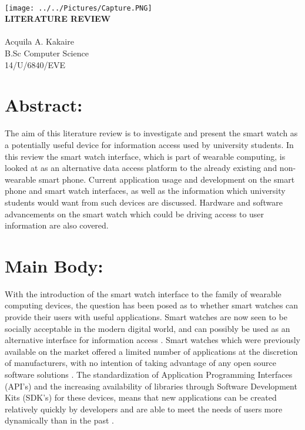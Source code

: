 \documentclass[10pt,a4paper]{article}
\begin{document}
\textbf{}\\


\begin{center}
\texttt{[image: ../../Pictures/Capture.PNG]}\\\vspace{3cm}
  {\Huge \textbf{LITERATURE REVIEW}}
  \\\vspace{1.00cm}{\Large An investigation into the usefulness of the Android Wear Interface}
  \vspace{4cm}
  \\{\LARGE Acquila A. Kakaire}
  \vspace{1.5cm}
  \\{\Large B.Sc Computer Science}
  \vspace{1.5cm}
  \\{\Large 14/U/6840/EVE}
  \date{\today}
  \vspace{7.5cm}
		
\end{center}

\section{Abstract:} 
The aim of this literature review is to investigate and present the smart watch as a potentially useful device for information access used by university students.  In this review the smart watch interface, which is part of wearable computing, is looked at as an alternative data access platform to the already existing and non-wearable smart phone.  Current application usage and development on the smart phone and smart watch interfaces, as well as the information which university students would want from such devices are discussed.  Hardware and software advancements on the smart watch which could be driving access to user information are also covered.

\section{Main Body:}
With the introduction of the smart watch interface to the family of wearable computing devices, the  question  has  been  posed  as  to  whether  smart  watches  can  provide  their  users  with  useful applications.  Smart watches are now seen to be socially acceptable in the modern digital world, and can possibly be used as an alternative interface for information access \cite{Bieber}. Smart watches which were previously available on the market offered a limited number of applications at the discretion of manufacturers, with no intention of taking advantage of any open source software solutions \cite{Smith}.  The standardization of Application Programming Interfaces (API’s) and the increasing availability of libraries through Software Development Kits (SDK’s)  for  these  devices, means  that  new  applications  can  be  created  relatively  quickly  by developers and are able to meet the needs of users more dynamically than in the past \cite{Sachse}.
\end{document}
